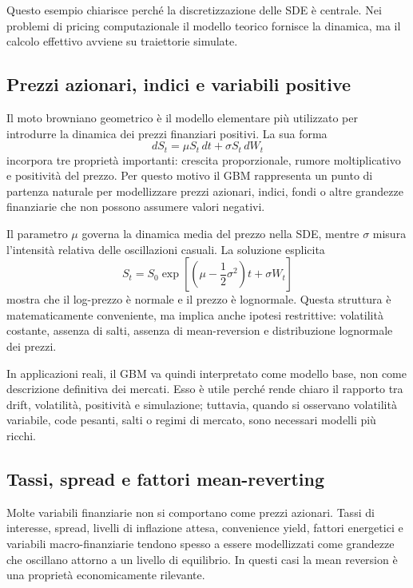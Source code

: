 Questo esempio chiarisce perch\'{e} la discretizzazione delle SDE \`{e}
centrale. Nei problemi di pricing computazionale il modello teorico
fornisce la dinamica, ma il calcolo effettivo avviene su traiettorie
simulate.

\subsection*{Prezzi azionari, indici e variabili positive}

Il moto browniano geometrico \`{e} il modello elementare pi\`{u} utilizzato
per introdurre la dinamica dei prezzi finanziari positivi. La sua forma
\[
dS_t=\mu S_t\,dt+\sigma S_t\,dW_t
\]
incorpora tre propriet\`{a} importanti: crescita proporzionale, rumore
moltiplicativo e positivit\`{a} del prezzo. Per questo motivo il GBM
rappresenta un punto di partenza naturale per modellizzare prezzi
azionari, indici, fondi o altre grandezze finanziarie che non possono
assumere valori negativi.

Il parametro $\mu$ governa la dinamica media del prezzo nella SDE, mentre
$\sigma$ misura l'intensit\`{a} relativa delle oscillazioni casuali. La
soluzione esplicita
\[
S_t
=
S_0
\exp\left[
\left(\mu-\frac{1}{2}\sigma^2\right)t+\sigma W_t
\right]
\]
mostra che il log-prezzo \`{e} normale e il prezzo \`{e} lognormale. Questa
struttura \`{e} matematicamente conveniente, ma implica anche ipotesi
restrittive: volatilit\`{a} costante, assenza di salti, assenza di
mean-reversion e distribuzione lognormale dei prezzi.

In applicazioni reali, il GBM va quindi interpretato come modello base,
non come descrizione definitiva dei mercati. Esso \`{e} utile perch\'{e}
rende chiaro il rapporto tra drift, volatilit\`{a}, positivit\`{a} e
simulazione; tuttavia, quando si osservano volatilità variabile, code
pesanti, salti o regimi di mercato, sono necessari modelli pi\`{u} ricchi.

\subsection*{Tassi, spread e fattori mean-reverting}

Molte variabili finanziarie non si comportano come prezzi azionari. Tassi
di interesse, spread, livelli di inflazione attesa, convenience yield,
fattori energetici e variabili macro-finanziarie tendono spesso a essere
modellizzati come grandezze che oscillano attorno a un livello di
equilibrio. In questi casi la mean reversion \`{e} una propriet\`{a}
economicamente rilevante.

